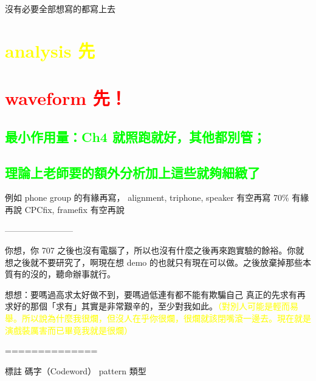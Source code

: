 
沒有必要全部想寫的都寫上去

\chapter{\textcolor{yellow}{analysis 先}}
\chapter{\textcolor{red}{waveform 先！}}

\section{\textcolor{lime}{最小作用量：Ch4 就照跑就好，其他都別管；}}
\section{\textcolor{lime}{理論上老師要的額外分析加上這些就夠細緻了}}

例如 phone group 的有緣再寫，
alignment, triphone, speaker 有空再寫
70\% 有緣再說
CPCfix, framefix 有空再說

\centering

------------------------

你想，你 707 之後也沒有電腦了，所以也沒有什麼之後再來跑實驗的餘裕。你就想之後就不要研究了，啊現在想 demo 的也就只有現在可以做。之後放棄掉那些本質有的沒的，聽命辦事就行。

想想：要嗎過高求太好做不到，要嗎過低連有都不能有欺騙自己
真正的先求有再求好的那個「求有」其實是非常艱辛的，至少對我如此。\textcolor{yellow}{（對別人可能是輕而易舉。所以說為什麼我很爛，但沒人在乎你很爛，很爛就該閉嘴滾一邊去。現在就是演戲裝厲害而已畢竟我就是很爛）}

==============

標註
碼字（Codeword）
pattern 類型
